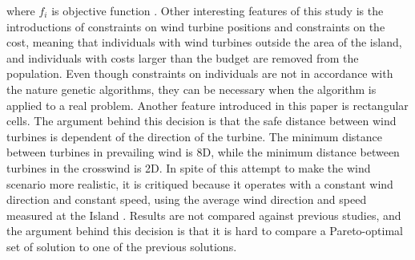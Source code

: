 where $f_i$ is objective function \citep{Murata}. Other interesting features of this study is the introductions of constraints on wind turbine positions and constraints on the cost, meaning that individuals with wind turbines outside the area of the island, and individuals with costs larger than the budget are removed from the population. Even though constraints on individuals are not in accordance with the nature genetic algorithms, they can be necessary when the algorithm is applied to a real problem. Another feature introduced in this paper is rectangular cells. The argument behind this decision is that the safe distance between wind turbines is dependent of the direction of the turbine. The minimum distance between turbines in prevailing wind is 8D, while the minimum distance between turbines in the crosswind is 2D. In spite of this attempt to make the wind scenario more realistic, it is critiqued because it operates with a constant wind direction and constant speed, using the average wind direction and speed measured at the Island \citep{Samorani}. Results are not compared against previous studies, and the argument behind this decision is that it is hard to compare a Pareto-optimal set of solution to one of the previous solutions. \\


